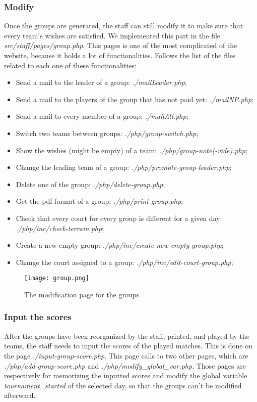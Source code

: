 \documentclass{article}
\begin{document}
\subsubsection{Modify}
Once the groups are generated, the staff can still modify it to make sure that every team's wishes are satisfied. We implemented this part in the file \textit{src/staff/pages/group.php}. This pages is one of the most complicated of the website, because it holds a lot of functionalities. Follows the list of the files related to each one of these functionalities:
\begin{itemize}
\item Send a mail to the leader of a group: \textit{./mailLeader.php};
\item Send a mail to the players of the group that has not paid yet: \textit{./mailNP.php};
\item Send a mail to every member of a group: \textit{./mailAll.php};
\item Switch two teams between groups: \textit{./php/group-switch.php};
\item Show the wishes (might be empty) of a team: \textit{./php/group-note(-vide).php};
\item Change the leading team of a group: \textit{./php/promote-group-leader.php};
\item Delete one of the group: \textit{./php/delete-group.php};
\item Get the pdf format of a group: \textit{./php/print-group.php};
\item Check that every court for every group is different for a given day: \textit{./php/inc/check-terrain.php};
\item Create a new empty group: \textit{./php/inc/create-new-empty-group.php};
\item Change the court assigned to a group: \textit{./php/inc/edit-court-group.php};
\end{itemize}

\begin{figure}[H]
\centering
\texttt{[image: group.png]}
\caption{The modification page for the groups}
\end{figure}

\subsubsection{Input the scores}
After the groups have been reorganized by the staff, printed, and played by the teams, the staff needs to input the scores of the played matches. This is done on the page \textit{./input-group-score.php}. This page calls to two other pages, which are \textit{./php/add-group-score.php} and \textit{./php/modify\_global\_var.php}. Those pages are respectively for memorizing the inputted scores and modify the global variable \textit{tournament\_started} of the selected day, so that the groups can't be modified afterward.
\end{document}
